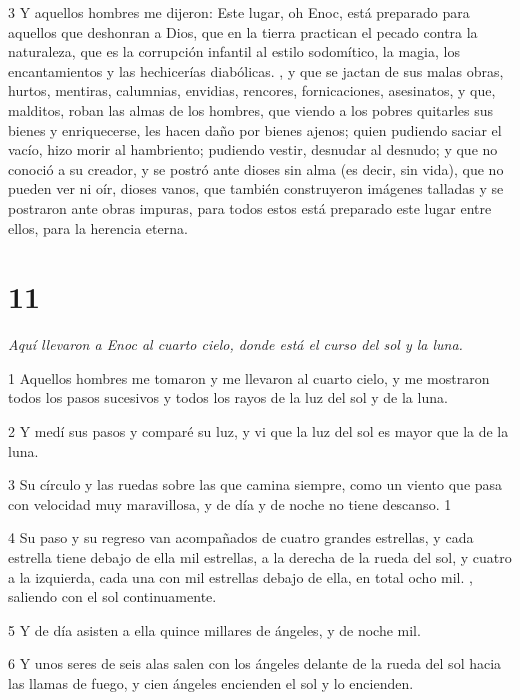 \par 3 Y aquellos hombres me dijeron: Este lugar, oh Enoc, está preparado para aquellos que deshonran a Dios, que en la tierra practican el pecado contra la naturaleza, que es la corrupción infantil al estilo sodomítico, la magia, los encantamientos y las hechicerías diabólicas. , y que se jactan de sus malas obras, hurtos, mentiras, calumnias, envidias, rencores, fornicaciones, asesinatos, y que, malditos, roban las almas de los hombres, que viendo a los pobres quitarles sus bienes y enriquecerse, les hacen daño por bienes ajenos; quien pudiendo saciar el vacío, hizo morir al hambriento; pudiendo vestir, desnudar al desnudo; y que no conoció a su creador, y se postró ante dioses sin alma (es decir, sin vida), que no pueden ver ni oír, dioses vanos, que también construyeron imágenes talladas y se postraron ante obras impuras, para todos estos está preparado este lugar entre ellos, para la herencia eterna.

\chapter{11}

\par \textit{Aquí llevaron a Enoc al cuarto cielo, donde está el curso del sol y la luna.}

\par 1 Aquellos hombres me tomaron y me llevaron al cuarto cielo, y me mostraron todos los pasos sucesivos y todos los rayos de la luz del sol y de la luna.

\par 2 Y medí sus pasos y comparé su luz, y vi que la luz del sol es mayor que la de la luna.

\par 3 Su círculo y las ruedas sobre las que camina siempre, como un viento que pasa con velocidad muy maravillosa, y de día y de noche no tiene descanso. 1

\par 4 Su paso y su regreso van acompañados de cuatro grandes estrellas, y cada estrella tiene debajo de ella mil estrellas, a la derecha de la rueda del sol, y cuatro a la izquierda, cada una con mil estrellas debajo de ella, en total ocho mil. , saliendo con el sol continuamente.

\par 5 Y de día asisten a ella quince millares de ángeles, y de noche mil.

\par 6 Y unos seres de seis alas salen con los ángeles delante de la rueda del sol hacia las llamas de fuego, y cien ángeles encienden el sol y lo encienden.

